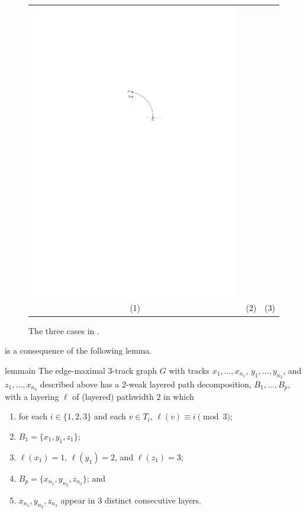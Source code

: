 \documentclass{patmorin}
\begin{document}
\begin{figure}
\begin{center}
\begin{tabular}{ccc}
       \includegraphics{figs/silly-3} \\
       (1) & (2) & (3)
     \end{tabular}
   \end{center}
   \caption{The three cases in .}
\end{figure}


 is a consequence of the following lemma.

\begin{restatable}{lem}{main}
  The edge-maximal 3-track graph $G$ with tracks $x_1,\ldots,x_{n_1}$, $y_1,\ldots,y_{n_2}$, and $z_1,\ldots,x_{n_3}$ described above has a 2-weak layered path
  decomposition, $B_1,\ldots,B_p$, with a layering $\ell$ of (layered) pathwidth $2$ in which
  \begin{enumerate}
    \item for each $i\in\{1,2,3\}$ and each $v\in T_i$,
      $\ell(v)\equiv i\pmod 3$;
    \item $B_1=\{x_1,y_1,z_1\}$;
    \item $\ell(x_1)=1$, $\ell(y_1)=2$, and $\ell(z_1)=3$;
    \item $B_p=\{x_{n_1},y_{n_2},z_{n_3}\}$; and
    \item $x_{n_1},y_{n_2},z_{n_3}$ appear in 3 distinct consecutive layers.
  \end{enumerate}
\end{restatable}
\end{document}
